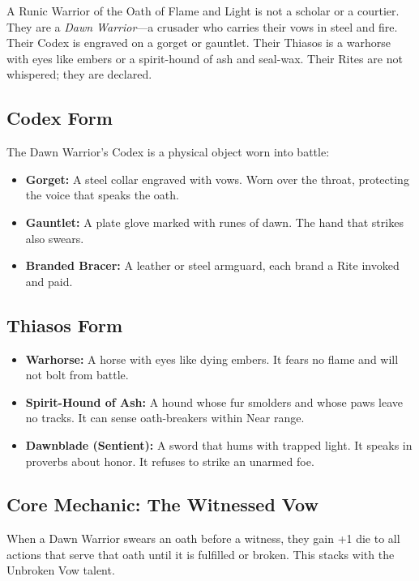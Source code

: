 A Runic Warrior of the Oath of Flame and Light is not a scholar or a courtier. They are a \textit{Dawn Warrior}—a crusader who carries their vows in steel and fire. Their Codex is engraved on a gorget or gauntlet. Their Thiasos is a warhorse with eyes like embers or a spirit-hound of ash and seal-wax. Their Rites are not whispered; they are declared.

\subsection{Codex Form}

The Dawn Warrior's Codex is a physical object worn into battle:

\begin{itemize}
\item \textbf{Gorget:} A steel collar engraved with vows. Worn over the throat, protecting the voice that speaks the oath.
\item \textbf{Gauntlet:} A plate glove marked with runes of dawn. The hand that strikes also swears.
\item \textbf{Branded Bracer:} A leather or steel armguard, each brand a Rite invoked and paid.
\end{itemize}

\subsection{Thiasos Form}

\begin{itemize}
\item \textbf{Warhorse:} A horse with eyes like dying embers. It fears no flame and will not bolt from battle.
\item \textbf{Spirit-Hound of Ash:} A hound whose fur smolders and whose paws leave no tracks. It can sense oath-breakers within Near range.
\item \textbf{Dawnblade (Sentient):} A sword that hums with trapped light. It speaks in proverbs about honor. It refuses to strike an unarmed foe.
\end{itemize}

\subsection{Core Mechanic: The Witnessed Vow}

When a Dawn Warrior swears an oath before a witness, they gain +1 die to all actions that serve that oath until it is fulfilled or broken. This stacks with the Unbroken Vow talent.

